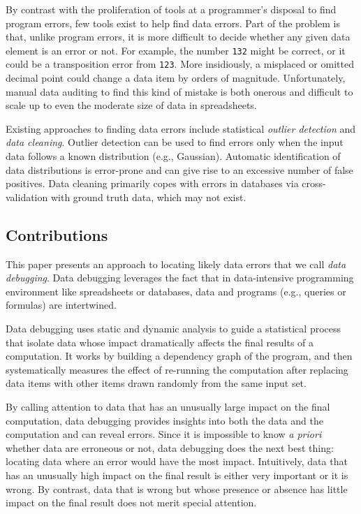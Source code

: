 By contrast with the proliferation of tools at a programmer's disposal
to find program errors, few tools exist to help find data errors. Part
of the problem is that, unlike program errors, it is more difficult to
decide whether any given data element is an error or not. For example,
the number \texttt{132} might be correct, or it could be a
transposition error from \texttt{123}. More insidiously, a misplaced
or omitted decimal point could change a data item by orders of
magnitude. Unfortunately, manual data auditing to find this kind of
mistake is both onerous and difficult to scale up to even the moderate
size of data in spreadsheets.



Existing approaches to finding data errors include
statistical \emph{outlier detection} and \emph{data cleaning}. Outlier
detection can be used to find errors only when the input data follows
a known distribution (e.g., Gaussian). Automatic identification of
data distributions is error-prone and can give rise to an excessive
number of false positives. Data cleaning primarily copes with errors
in databases via cross-validation with ground truth data, which may
not exist.

\subsection*{Contributions}

This paper presents an approach to locating likely data errors that we
call \emph{data debugging}. Data debugging leverages the fact that in
data-intensive programming environment like spreadsheets or databases,
data and programs (e.g., queries or formulas) are intertwined.


Data debugging uses static and dynamic analysis to guide a statistical
process that isolate data whose impact dramatically affects the final
results of a computation. It works by building a dependency graph of
the program, and then systematically measures the effect of re-running
the computation after replacing data items with other items drawn
randomly from the same input set.

By calling attention to data that has an unusually large impact on the
final computation, data debugging provides insights into both the data
and the computation and can reveal errors. Since it is impossible to
know \emph{a priori} whether data are erroneous or not, data debugging
does the next best thing: locating data where an error would have the
most impact. Intuitively, data that has an unusually high impact on
the final result is either very important or it is wrong. By
contrast, data that is wrong but whose presence or absence has little
impact on the final result does not merit special attention.

